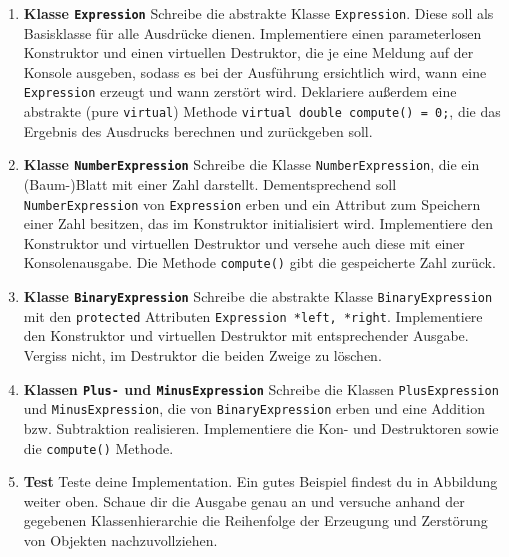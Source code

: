 \begin{enumerate}

\item \textbf{Klasse \texttt{Expression}}
Schreibe die abstrakte Klasse \texttt{Expression}.
Diese soll als Basisklasse für alle Ausdrücke dienen.
Implementiere einen parameterlosen Konstruktor und einen virtuellen Destruktor, die je eine Meldung auf der Konsole ausgeben, sodass es bei der Ausführung ersichtlich wird, wann eine \texttt{Expression} erzeugt und wann zerstört wird.
Deklariere außerdem eine abstrakte (pure \texttt{virtual}) Methode \texttt{virtual double compute() = 0;}, die das Ergebnis des Ausdrucks berechnen und zurückgeben soll. 

\item \textbf{Klasse \texttt{NumberExpression}}
Schreibe die Klasse \texttt{NumberExpression}, die ein (Baum-)Blatt mit einer Zahl darstellt.
Dementsprechend soll \texttt{NumberExpression} von \texttt{Expression} erben und ein Attribut zum Speichern einer Zahl besitzen, das im Konstruktor initialisiert wird.
Implementiere den Konstruktor und virtuellen Destruktor und versehe auch diese mit einer Konsolenausgabe.
Die Methode \texttt{compute()} gibt die gespeicherte Zahl zurück.

\item \textbf{Klasse \texttt{BinaryExpression}}
Schreibe die abstrakte Klasse \texttt{BinaryExpression} mit den \texttt{protected} Attributen \texttt{Expression *left, *right}.
Implementiere den Konstruktor und virtuellen Destruktor mit entsprechender Ausgabe.
Vergiss nicht, im Destruktor die beiden Zweige zu löschen. 

\item \textbf{Klassen \texttt{Plus-} und \texttt{MinusExpression}}
Schreibe die Klassen \texttt{PlusExpression} und \texttt{MinusExpression}, die von \texttt{BinaryExpression} erben und eine Addition bzw. Subtraktion realisieren. 
Implementiere die Kon- und Destruktoren sowie die \texttt{compute()} Methode.

\item \textbf{Test}
Teste deine Implementation.
Ein gutes Beispiel findest du in Abbildung weiter oben.
Schaue dir die Ausgabe genau an und versuche anhand der gegebenen Klassenhierarchie die Reihenfolge der Erzeugung und Zerstörung von Objekten  nachzuvollziehen.

\end{enumerate}
